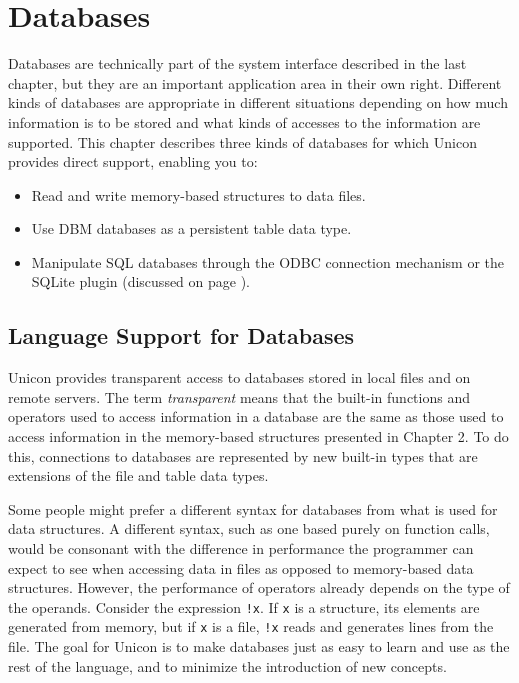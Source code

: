 \chapter{Databases}

Databases are technically part of the system interface
described in the last chapter, but they are an important application
area in their own right. Different kinds of databases are
appropriate in different situations depending on how much information is to
be stored and what kinds of accesses to the information are supported.
This chapter describes three kinds of databases for which Unicon
provides direct support, enabling you to:

\begin{itemize}
\item Read and write memory-based structures to data files.
\item Use DBM databases as a persistent table data type.
\item Manipulate SQL databases through the ODBC connection mechanism
  or the SQLite plugin (discussed on page \pageref{SQLitePlugin}).
\end{itemize}

\section{Language Support for Databases}

Unicon provides transparent access to databases stored in local files
and on remote servers. The term
{\em transparent\/} means that the built-in
functions and operators used to access information in a database are
the same as those used to access information in the memory-based
structures presented in Chapter 2. To do this, connections to databases
are represented by new built-in types that are extensions of the file
and table data types.

Some people might prefer a different syntax for databases from what is
used for data structures. A different syntax, such as one based purely
on function calls, would be consonant with the difference in
performance the programmer can expect to see when accessing data in
files as opposed to memory-based data structures. However, the
performance of operators already depends on the type of the operands.
Consider the expression \texttt{!x}. If \texttt{x} is a structure, its
elements are generated from memory, but if \texttt{x} is a file,
\texttt{!x} reads and generates lines from the file. The goal for
Unicon is to make databases just as easy to learn and use as the rest
of the language, and to minimize the introduction of new concepts.

